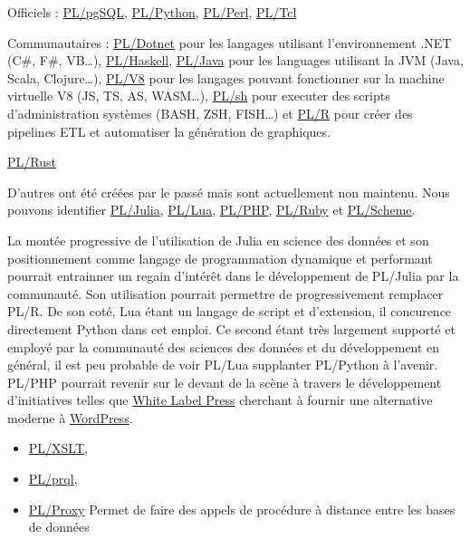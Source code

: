 \documentclass[a4paper,12pt]{article}
\begin{document}
\begin{multicols*}{2}
Officiels : \href{https://www.postgresql.org/docs/current/plpgsql.html}{PL/pgSQL}, \href{https://www.postgresql.org/docs/current/plpython.html}{PL/Python}, \href{https://www.postgresql.org/docs/current/plperl.html}{PL/Perl}, \href{https://www.postgresql.org/docs/current/pltcl.html}{PL/Tcl}

Communautaires : \href{https://github.com/Brick-Abode/pldotnet/}{PL/Dotnet} pour les langages utilisant l'environnement .NET (C\#, F\#, VB\ldots{}), \href{https://github.com/ed-o-saurus/PLHaskell}{PL/Haskell}, \href{https://github.com/tada/pljava/}{PL/Java} pour les languages utilisant la JVM (Java, Scala, Clojure\ldots{}), \href{https://github.com/plv8/plv8}{PL/V8} pour les langages pouvant fonctionner sur la machine virtuelle V8 (JS, TS, AS, WASM\ldots{}), \href{https://github.com/petere/plsh}{PL/sh} pour executer des scripts d'administration systèmes (BASH, ZSH, FISH\ldots{}) et \href{https://github.com/postgres-plr/plr}{PL/R} pour créer des pipelines ETL et automatiser la génération de graphiques.

\href{https://github.com/tcdi/plrust/}{PL/Rust}

D'autres ont été créées par le passé mais sont actuellement non maintenu. Nous pouvons identifier \href{https://github.com/pljulia/pljulia}{PL/Julia}, \href{https://github.com/pllua/pllua-ng/}{PL/Lua}, \href{https://github.com/commandprompt/PL-php}{PL/PHP}, \href{https://github.com/knu/postgresql-plruby}{PL/Ruby} et \href{https://github.com/vy/plscheme}{PL/Scheme}.

La montée progressive de l'utilisation de Julia en science des données et son positionnement comme langage de programmation dynamique et performant pourrait entrainner un regain d'intérêt dans le développement de PL/Julia par la communauté. Son utilisation pourrait permettre de progressivement remplacer PL/R.
De son coté, Lua étant un langage de script et d'extension, il concurence directement Python dans cet emploi. Ce second étant très largement supporté et employé par la communauté des sciences des données et du développement en général, il est peu probable de voir PL/Lua supplanter PL/Python à l'avenir. 
PL/PHP pourrait revenir sur le devant de la scène à travers le développement d'initiatives telles que \href{https://github.com/wlp-builders/whitelabelpress-wlp}{White Label Press} cherchant à fournir une alternative moderne à \href{https://github.com/WordPress/WordPress}{WordPress}.

\begin{itemize}
\item \href{https://github.com/petere/plxslt}{PL/XSLT},
\item \href{https://github.com/kaspermarstal/plprql}{PL/prql},
\item \href{https://github.com/plproxy/plproxy}{PL/Proxy} Permet de faire des appels de procédure à distance entre les bases de données
\end{itemize}


\end{multicols*}
\end{document}
